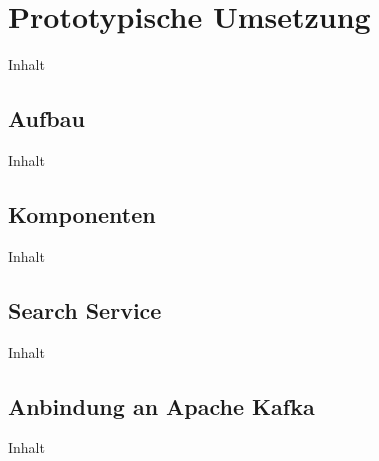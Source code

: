 \chapter{Prototypische Umsetzung\label{chap5:Fuenftes-Kapitel}}

Inhalt

\section{Aufbau\label{sec5.1:Unterpunkt-1}}

Inhalt

\section{Komponenten\label{sec5.2:Unterpunkt-2}}

Inhalt

\section{Search Service\label{sec5.3:Unterpunkt-3}}

Inhalt

\section{Anbindung an Apache Kafka\label{sec5.4:Unterpunkt-4}}

Inhalt